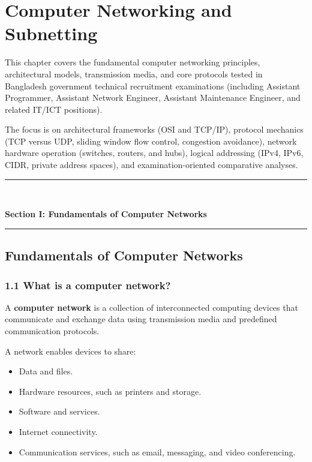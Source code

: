 \chapter{Computer Networking and Subnetting}
\label{ch:networking_subnetting}

This chapter covers the fundamental computer networking principles, architectural models, transmission media, and core protocols tested in Bangladesh government technical recruitment examinations (including Assistant Programmer, Assistant Network Engineer, Assistant Maintenance Engineer, and related IT/ICT positions).

The focus is on architectural frameworks (OSI and TCP/IP), protocol mechanics (TCP versus UDP, sliding window flow control, congestion avoidance), network hardware operation (switches, routers, and hubs), logical addressing (IPv4, IPv6, CIDR, private address spaces), and examination-oriented comparative analyses.

\newpage
\begin{center}
\vspace{0.5em}
{\color{primary}\rule{0.45\textwidth}{1.2pt}\\[4pt]}
{\Large\bfseries\color{primary} Section I: Fundamentals of Computer Networks\\[2pt]}
{\color{primary}\rule{0.45\textwidth}{1.2pt}}
\vspace{0.5em}
\end{center}

\section{Fundamentals of Computer Networks}

\subsection{1.1 What is a computer network?}

A \textbf{computer network} is a collection of interconnected computing devices that communicate and exchange data using transmission media and predefined communication protocols.

A network enables devices to share:

\begin{itemize}
    \item Data and files.
    \item Hardware resources, such as printers and storage.
    \item Software and services.
    \item Internet connectivity.
    \item Communication services, such as email, messaging, and video conferencing.
\end{itemize}

